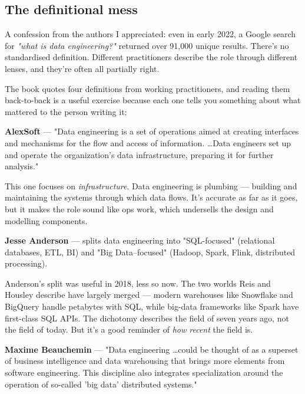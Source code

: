 \subsection{The definitional mess}

A confession from the authors I appreciated: even in early 2022, a Google search for \emph{"what is data engineering?"} returned over 91{,}000 unique results. There's no standardised definition. Different practitioners describe the role through different lenses, and they're often all partially right.

The book quotes four definitions from working practitioners, and reading them back-to-back is a useful exercise because each one tells you something about what mattered to the person writing it:

\begin{quotebox}
\textbf{AlexSoft} — "Data engineering is a set of operations aimed at creating interfaces and mechanisms for the flow and access of information. \dots Data engineers set up and operate the organization's data infrastructure, preparing it for further analysis."
\end{quotebox}

This one focuses on \emph{infrastructure}. Data engineering is plumbing — building and maintaining the systems through which data flows. It's accurate as far as it goes, but it makes the role sound like ops work, which undersells the design and modelling components.

\begin{quotebox}
\textbf{Jesse Anderson} — splits data engineering into "SQL-focused" (relational databases, ETL, BI) and "Big Data–focused" (Hadoop, Spark, Flink, distributed processing).
\end{quotebox}

Anderson's split was useful in 2018, less so now. The two worlds Reis and Housley describe have largely merged — modern warehouses like Snowflake and BigQuery handle petabytes with SQL, while big-data frameworks like Spark have first-class SQL APIs. The dichotomy describes the field of seven years ago, not the field of today. But it's a good reminder of \emph{how recent} the field is.

\begin{quotebox}
\textbf{Maxime Beauchemin} — "Data engineering \dots could be thought of as a superset of business intelligence and data warehousing that brings more elements from software engineering. This discipline also integrates specialization around the operation of so-called 'big data' distributed systems."
\end{quotebox}

